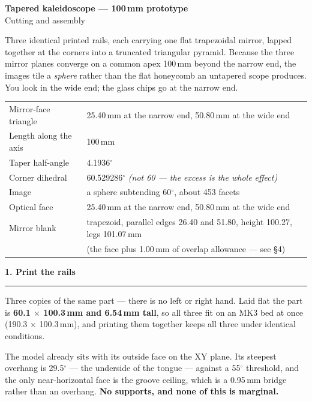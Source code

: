 \documentclass[letterpaper,11pt]{article}
\newcommand{\head}[1]{\vspace{3mm}\textbf{\large #1}\vspace{1mm}\hrule\vspace{2mm}}
\begin{document}
\begin{center}
  {\LARGE\bfseries Tapered kaleidoscope --- 100\,mm prototype}\\[2mm]
  {\large Cutting and assembly}
\end{center}

\vspace{2mm}

Three identical printed rails, each carrying one flat trapezoidal mirror, lapped together
at the corners into a truncated triangular pyramid. Because the three mirror planes
converge on a common apex 100\,mm beyond the narrow end, the images tile a \emph{sphere}
rather than the flat honeycomb an untapered scope produces. You look in the wide end; the
glass chips go at the narrow end.

\begin{center}
\begin{tabular}{@{}ll@{}}
\toprule
Mirror-face triangle & 25.40\,mm at the narrow end, 50.80\,mm at the wide end \\
Length along the axis & 100\,mm \\
Taper half-angle & 4.1936$^\circ$ \\
Corner dihedral & 60.529286$^\circ$ \emph{(not 60 --- the excess is the whole effect)} \\
Image & a sphere subtending 60$^\circ$, about 453 facets \\
Optical face & 25.40\,mm at the narrow end, 50.80\,mm at the wide end \\
Mirror blank & trapezoid, parallel edges 26.40 and 51.80, height 100.27, legs 101.07\,mm \\
 & (the face plus 1.00\,mm of overlap allowance --- see \S4) \\
\bottomrule
\end{tabular}
\end{center}

\head{1. Print the rails}

Three copies of the same part --- there is no left or right hand. Laid flat the part is
\textbf{60.1 $\times$ 100.3\,mm and 6.54\,mm tall}, so all three fit on an MK3 bed at once
(190.3 $\times$ 100.3\,mm), and printing them together keeps all three under identical
conditions.

The model already sits with its outside face on the XY plane. Its steepest overhang is
29.5$^\circ$ --- the underside of the tongue --- against a 55$^\circ$ threshold, and the only
near-horizontal face is the groove ceiling, which is a 0.95\,mm bridge rather than an
overhang. \textbf{No supports, and none of this is marginal.}
\end{document}
